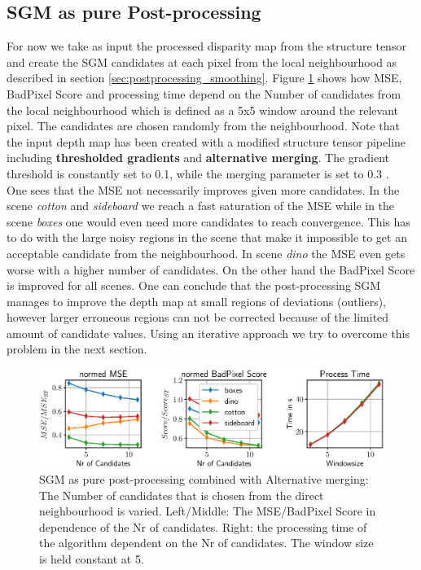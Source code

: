 \documentclass  [
  paper    = a4,
  BCOR     = 10mm,
  twoside,
  fontsize = 12pt,
  fleqn,
  toc      = bibnumbered,
  toc      = listofnumbered,
  numbers  = noendperiod,
  headings = normal,
  listof   = leveldown,
  version  = 3.03
]                                       {scrreprt}
\begin{document}
\subsection*{SGM as pure Post-processing}
\label{sec:sgmppr_ev}

For now we take as input the processed disparity map from the structure tensor and create the SGM candidates at each pixel from the local neighbourhood as described in section \ref{sec:postprocessing_smoothing}. Figure \ref{fig:chooselowersgmpprwindowsize5} shows how MSE, BadPixel Score and processing time depend on the Number of candidates from the local neighbourhood which is defined as a 5x5 window around the relevant pixel. The candidates are chosen randomly from the neighbourhood. Note that the input depth map has been created with a modified structure tensor pipeline including \textbf{thresholded gradients} and \textbf{alternative merging}. The gradient threshold is constantly set to 0.1, while the merging parameter is set to 0.3 .\\
 One sees that the MSE not necessarily improves given more candidates. In the scene \textit{cotton} and \textit{sideboard} we reach a fast saturation of the MSE while in the scene \textit{boxes} one would even need more candidates to reach convergence. This has to do with the large noisy regions in the scene that make it impossible to get an acceptable candidate from the neighbourhood. In scene \textit{dino} the MSE even gets worse with a higher number of candidates. On the other hand the BadPixel Score is improved for all scenes. One can conclude that the post-processing SGM manages to improve the depth map at small regions of deviations (outliers), however larger erroneous regions can not be corrected because of the limited amount of candidate values. Using an iterative approach we try to overcome this problem in the next section.\\ 


\begin{figure}
	\centering
	\includegraphics[width=01\linewidth]{images/choose_lower_sgm_ppr_windowsize_5}
	\caption[SGM as pure post-processing combined with Alternative merging parameter dependence]{SGM as pure post-processing combined with Alternative merging: The Number of candidates that is chosen from the direct neighbourhood is varied. Left/Middle: The MSE/BadPixel Score in dependence of the Nr of candidates. Right: the processing time of the algorithm dependent on the Nr of candidates. The window size is held constant at 5.}
	\label{fig:chooselowersgmpprwindowsize5}
\end{figure}
\end{document}
